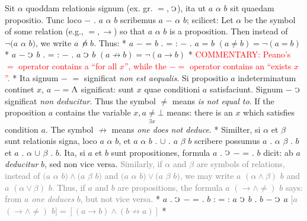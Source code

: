 \documentclass{book}
\newcommand{\C}{\mathop{\sbox0{$\displaystyle$$\reflectbox{C}$} %
\raisebox{-\height+\ht0-0.05cm}[\ht0][\dp0]{\scalebox{0.8}[0.8]{\copy0}}}\displaylimits} %
\newcommand{\abs}{\mathop{\rotatebox[origin=c]{180}{V}}}
\newcommand\irrelavent[1]{\textcolor{gray}{#1}}
\newcommand\commentary[1]{\textcolor{red}{COMMENTARY: #1}}
\newenvironment{translateTwoCol}
               { %
                 \columnratio{0.5, 0.5}
                 \begin{paracol}{2}
                 \newcommand{\LAT}{\switchcolumn[0]*}
                 \newcommand{\ENG}{\switchcolumn[1]}
               }
               { %
                 \let\ENG\undefined
                 \let\LAT\undefined
                 \end{paracol}
               }
\begin{document}
\begin{translateTwoCol}
\quad Sit $\alpha$ quoddam relationis signum (ex. gr. $=$, $\C$), ita ut $a$ $\alpha$ $b$ sit quaedam propositio. Tunc loco $-$ . $a$ $\alpha$ $b$ scribemus $a$ $-$ $\alpha$ $b$; scilicet:
\ENG
\quad Let $\alpha$ be the symbol of some relation (e.g., $=, \rightarrow$) so that $a$ $\alpha$ $b$ is a proposition. Then instead of $\neg(a$ $\alpha$ $b)$, we write $a$ $\not\mathrel{\,\alpha\!}$ $b$. Thus:
\LAT
\hspace{1.06cm} $a$ $-$ = $b$ . = : $-$ . $a$ = $b$
\ENG
\hspace{1.06cm} $(a \not= b) = \neg (a=b)$
\LAT
\hspace{1.06cm} $a$ $-$ $\C$ $b$ . = : $-$ . $a$ $\C$ $b$
\ENG
\hspace{1.06cm} $ (a \not\rightarrow b) = \neg (a \rightarrow b)$
\LAT
\ENG
\commentary{Peano's $=$\scalebox{0.7}{$x$} operator contains a ``for all $x$'', while the $-=$\scalebox{0.7}{$x$} operator contains an ``exists $x$''.}
\LAT
\quad Ita signum $-$ $=$ significat \emph{non est aequalis}. Si propositio $a$ indeterminatum continet $x$, $a$ $-=$\scalebox{0.7}{$x$}\thinspace $\abs$ significat: sunt $x$ quae conditioni $a$ satisfaciunt. Signum $-$ $\C$ significat \emph{non deducitur}.
\ENG
Thus the symbol $\not=$ means \emph{is not equal to}. If the proposition $a$ contains the variable $x, a\underset{\exists x}\neq \bot$ means: there is an $x$ which satisfies condition $a$. The symbol $\not\rightarrow$ means \emph{one does not deduce}.
\LAT
\quad Similter, si $\alpha$ et $\beta$ sunt relationis signa, loco $a$ $\alpha$ $b$, et $a$ $\alpha$ $b$ . $\cup$ . $a$ $\beta$ $b$ scribere possumus $a$ . $\alpha$ $\beta$ . $b$ et $a$ . $\alpha$ $\cup$ $\beta$ . $b$. Ita, si $a$ et $b$ sunt propositiones, formula $a$ . $\C$ $-$ = . $b$ dicit: ab $a$ \emph{deducitur} $b$, sed non vice versa.
\ENG
\quad \irrelavent{Similarly, if $\alpha$ and $\beta$ are symbols of relations, instead of $(a$ $\alpha$ $b) \wedge (a$ $\beta$ $b)$ and $(a$ $\alpha$ $b) \vee (a$ $\beta$ $b)$, we may write $a$ $(\alpha \wedge \beta)$ $b$ and $a$ $(\alpha \vee \beta)$ $b$. Thus, if $a$ and $b$ are propositions, the formula $a$ $(\rightarrow \wedge \not=)$ $b$ says: from $a$ \emph{one deduces} $b$, but not vice versa.}
\LAT
\hspace{1.06cm} $a$ . $\C$ $-$ = . $b$ : = : $a$ $\C$ $b$ . $b$ $-$ $\C$ $a$
\ENG
\hspace{1.06cm} \irrelavent{ $[a$ $(\rightarrow \wedge \not=)$ $b] = [(a \rightarrow b) \wedge (b \not\rightarrow a)]$ }
\LAT

\end{translateTwoCol}
\end{document}
